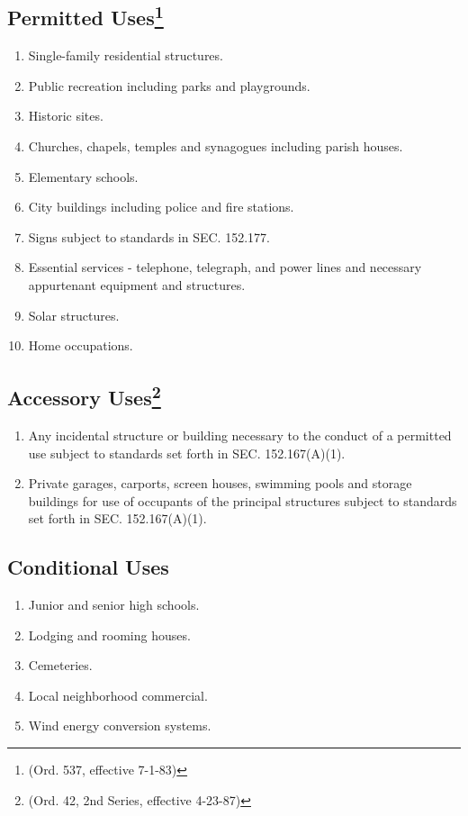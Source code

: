 \subsection{Permitted Uses\footnote{(Ord. 537, effective 7-1-83)}}
\begin{enumerate}[{\indent}1)]
    \item Single-family residential structures.
    \item Public recreation including parks and playgrounds.
    \item Historic sites.
    \item Churches, chapels, temples and synagogues including parish houses.
    \item Elementary schools.
    \item City buildings including police and fire stations.
    \item Signs subject to standards in SEC. 152.177.
    \item Essential services - telephone, telegraph, and power lines and necessary appurtenant equipment and structures.
    \item Solar structures.
    \item Home occupations.
\end{enumerate}
\subsection{Accessory Uses\footnote{(Ord. 42, 2nd Series, effective  4-23-87)}}
\begin{enumerate}[{\indent}1)]
    \item Any incidental structure or building necessary to the conduct of a permitted use subject to standards set forth in SEC. 152.167(A)(1).
    \item Private garages, carports, screen houses, swimming pools and storage buildings for use of occupants of the principal structures subject to standards set forth in SEC. 152.167(A)(1).
\end{enumerate}
\subsection{Conditional Uses}
\begin{enumerate}[{\indent}1)]
    \item Junior and senior high schools.
    \item Lodging and rooming houses.
    \item Cemeteries.  
    \item Local neighborhood commercial.  
    \item Wind energy conversion systems.
\end{enumerate}
